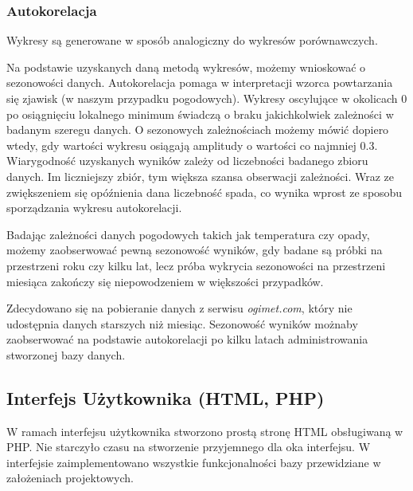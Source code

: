 \documentclass[12pt,a4paper]{article}
\begin{document}
\subsubsection{Autokorelacja}
Wykresy są generowane w sposób analogiczny do wykresów porównawczych.\par
Na podstawie uzyskanych daną metodą wykresów, możemy wnioskować o sezonowości danych. Autokorelacja pomaga w interpretacji wzorca powtarzania się zjawisk (w naszym przypadku pogodowych). Wykresy oscylujące w okolicach 0 po osiągnięciu lokalnego minimum świadczą o braku jakichkolwiek zależności w badanym szeregu danych. O sezonowych zależnościach możemy mówić dopiero wtedy, gdy wartości wykresu osiągają amplitudy o wartości co najmniej 0.3. Wiarygodność uzyskanych wyników zależy od liczebności badanego zbioru danych. Im liczniejszy zbiór, tym większa szansa obserwacji zależności. Wraz ze zwiększeniem się opóźnienia dana liczebność spada, co wynika wprost ze sposobu sporządzania wykresu autokorelacji.\par
Badając zależności danych pogodowych takich jak temperatura czy opady, możemy zaobserwować pewną sezonowość wyników, gdy badane są próbki na przestrzeni roku czy kilku lat, lecz próba wykrycia sezonowości na przestrzeni miesiąca zakończy się niepowodzeniem w większości przypadków.\par
Zdecydowano się na pobieranie danych z serwisu \textit{ogimet.com}, który nie udostępnia danych starszych niż miesiąc. Sezonowość wyników możnaby zaobserwować na podstawie autokorelacji po kilku latach administrowania stworzonej bazy danych.
\subsection{Interfejs Użytkownika (HTML, PHP)}
W ramach interfejsu użytkownika stworzono prostą stronę HTML obsługiwaną w PHP. Nie starczyło czasu na stworzenie przyjemnego dla oka interfejsu. W interfejsie zaimplementowano wszystkie funkcjonalności bazy przewidziane w założeniach projektowych.
\end{document}
